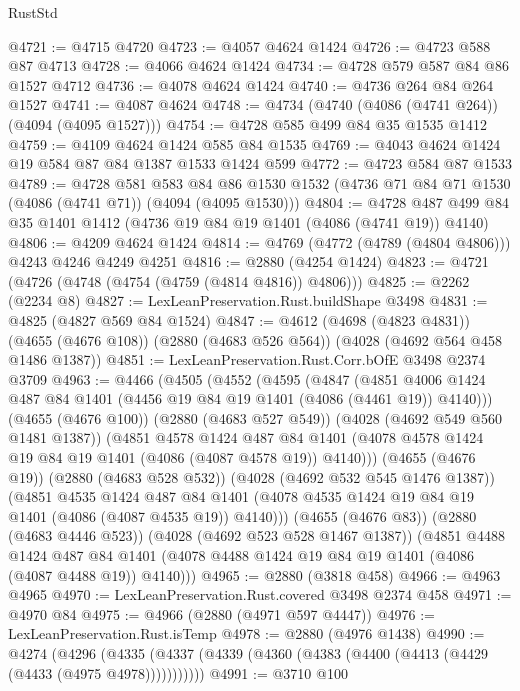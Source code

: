 \begin{lexlean}{RustStd}
\begin{coremodule}
@4721 := @4715 @4720
@4723 := @4057 @4624 @1424
@4726 := @4723 @588 @87 @4713
@4728 := @4066 @4624 @1424
@4734 := @4728 @579 @587 @84 @86 @1527 @4712
@4736 := @4078 @4624 @1424
@4740 := @4736 @264 @84 @264 @1527
@4741 := @4087 @4624
@4748 := @4734 (@4740 (@4086 (@4741 @264)) (@4094 (@4095 @1527)))
@4754 := @4728 @585 @499 @84 @35 @1535 @1412
@4759 := @4109 @4624 @1424 @585 @84 @1535
@4769 := @4043 @4624 @1424 @19 @584 @87 @84 @1387 @1533 @1424 @599
@4772 := @4723 @584 @87 @1533
@4789 := @4728
    @581
    @583
    @84
    @86
    @1530
    @1532
    (@4736 @71 @84 @71 @1530 (@4086 (@4741 @71)) (@4094 (@4095 @1530)))
@4804 := @4728 @487 @499 @84 @35 @1401 @1412 (@4736 @19 @84 @19 @1401 (@4086 (@4741 @19)) @4140)
@4806 := @4209 @4624 @1424
@4814 := @4769 (@4772 (@4789 (@4804 @4806))) @4243 @4246 @4249 @4251
@4816 := @2880 (@4254 @1424)
@4823 := @4721 (@4726 (@4748 (@4754 (@4759 (@4814 @4816)) @4806)))
@4825 := @2262 (@2234 @8)
@4827 := LexLeanPreservation.Rust.buildShape @3498
@4831 := @4825 (@4827 @569 @84 @1524)
@4847 := @4612
    (@4698 (@4823 @4831))
    (@4655 (@4676 @108))
    (@2880 (@4683 @526 @564))
    (@4028 (@4692 @564 @458 @1486 @1387))
@4851 := LexLeanPreservation.Rust.Corr.bOfE @3498 @2374 @3709
@4963 := @4466
    (@4505
      (@4552
        (@4595
          (@4847
            (@4851 @4006 @1424 @487 @84 @1401 (@4456 @19 @84 @19 @1401 (@4086 (@4461 @19)) @4140)))
          (@4655 (@4676 @100))
          (@2880 (@4683 @527 @549))
          (@4028 (@4692 @549 @560 @1481 @1387))
          (@4851
            @4578
            @1424
            @487
            @84
            @1401
            (@4078 @4578 @1424 @19 @84 @19 @1401 (@4086 (@4087 @4578 @19)) @4140)))
        (@4655 (@4676 @19))
        (@2880 (@4683 @528 @532))
        (@4028 (@4692 @532 @545 @1476 @1387))
        (@4851
          @4535
          @1424
          @487
          @84
          @1401
          (@4078 @4535 @1424 @19 @84 @19 @1401 (@4086 (@4087 @4535 @19)) @4140)))
      (@4655 (@4676 @83))
      (@2880 (@4683 @4446 @523))
      (@4028 (@4692 @523 @528 @1467 @1387))
      (@4851
        @4488
        @1424
        @487
        @84
        @1401
        (@4078 @4488 @1424 @19 @84 @19 @1401 (@4086 (@4087 @4488 @19)) @4140)))
@4965 := @2880 (@3818 @458)
@4966 := @4963 @4965
@4970 := LexLeanPreservation.Rust.covered @3498 @2374 @458
@4971 := @4970 @84
@4975 := @4966 (@2880 (@4971 @597 @4447))
@4976 := LexLeanPreservation.Rust.isTemp
@4978 := @2880 (@4976 @1438)
@4990 := @4274
    (@4296 (@4335 (@4337 (@4339 (@4360 (@4383 (@4400 (@4413 (@4429 (@4433 (@4975 @4978)))))))))))
@4991 := @3710 @100

\end{coremodule}
\end{lexlean}
